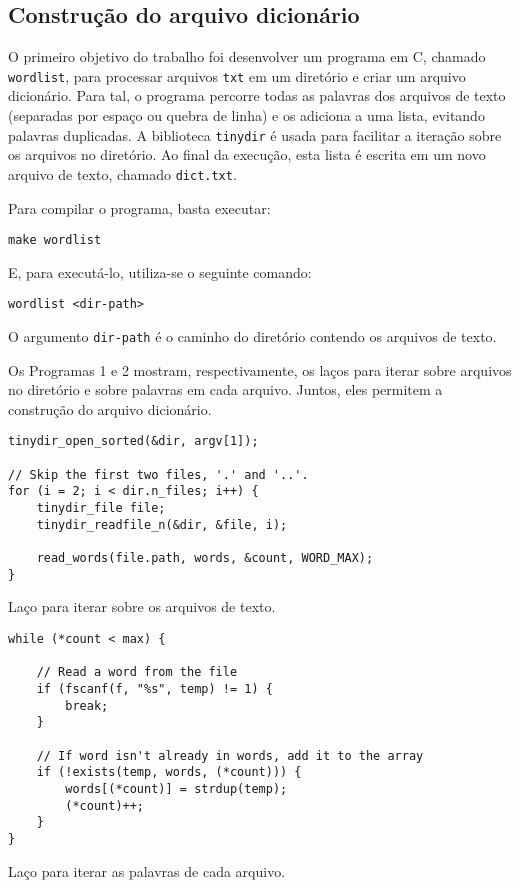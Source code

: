 \documentclass{sig-alternate-05-2015}
\begin{document}
\subsection{Construção do arquivo dicionário}
O primeiro objetivo do trabalho foi desenvolver um programa em C, chamado \texttt{wordlist}, para processar arquivos \texttt{txt} em um diretório e criar um arquivo dicionário.
Para tal, o programa percorre todas as palavras dos arquivos de texto (separadas por espaço ou quebra de linha) e os adiciona a uma lista, evitando palavras duplicadas. A biblioteca \texttt{tinydir} \cite{tinydir} é usada para facilitar a iteração sobre os arquivos no diretório. Ao final da execução, esta lista é escrita em um novo arquivo de texto, chamado \texttt{dict.txt}.

Para compilar o programa, basta executar:
\begin{verbatim}
make wordlist
\end{verbatim}

E, para executá-lo, utiliza-se o seguinte comando:
\begin{verbatim}
wordlist <dir-path>
\end{verbatim}

O argumento \texttt{dir-path} é o caminho do diretório contendo os arquivos de texto.

Os Programas 1 e 2 mostram, respectivamente, os laços para iterar sobre arquivos no diretório e sobre palavras em cada arquivo.
Juntos, eles permitem a construção do arquivo dicionário.

\begin{program}
\begin{lstlisting}
tinydir_open_sorted(&dir, argv[1]);

// Skip the first two files, '.' and '..'.
for (i = 2; i < dir.n_files; i++) {
    tinydir_file file;
    tinydir_readfile_n(&dir, &file, i);
    
    read_words(file.path, words, &count, WORD_MAX);
}
\end{lstlisting}
\caption{Laço para iterar sobre os arquivos de texto.}
\end{program}

\begin{program}
\begin{lstlisting}
while (*count < max) {

    // Read a word from the file
    if (fscanf(f, "%s", temp) != 1) {
        break;
    }

    // If word isn't already in words, add it to the array
    if (!exists(temp, words, (*count))) {
        words[(*count)] = strdup(temp);
        (*count)++;
    }
}
\end{lstlisting}
\caption{Laço para iterar as palavras de cada arquivo.}
\end{program}
\end{document}
